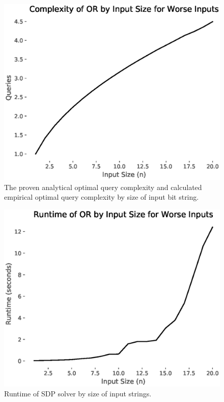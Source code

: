 \begin{figure}[ht]
\centering
\includegraphics[scale=.5]{figures/or_worst_complexity.eps}
\caption{The proven analytical optimal query complexity
and calculated empirical optimal query complexity by 
size of input bit string.}
\label{fig:or_worst_complexity}
\end{figure}

\begin{figure}[ht]
\centering
\includegraphics[scale=.4]{figures/or_worst_runtime.eps}
\caption{Runtime of SDP solver by size of input strings.}
\label{fig:or_worst_runtime}
\end{figure}

